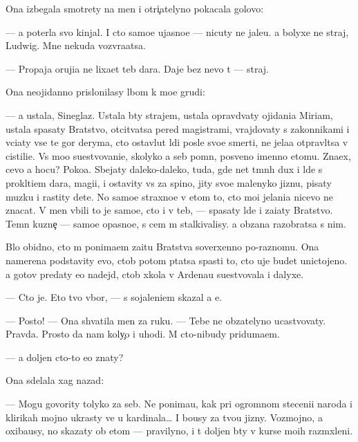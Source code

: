 \documentclass[10pt]{book}
\begin{document}
Ona izbegala smotrety na men{\ia} i otri{\c}atelyno pokacala golovo{\y}:

— {\Y}a poter{\ia}la svo{\y} kinjal. I cto samo{\y}e ujasno{\y}e — nicuty ne jale{\y}u. {\Y}a bolyxe ne straj, Ludwig. Mne nekuda vozvra{\x}atsa.

— Propaja oruji{\y}a ne lixa{\y}et teb{\ia} dara. Daje bez nevo t{\yi} — straj.

Ona neojidanno prislonilasy lbom k mo{\y}e{\y} grudi:

— {\Y}a ustala, Sineglaz{\yi}{\y}. Ustala b{\yi}ty strajem, ustala opravd{\yi}vaty ojidani{\y}a Miriam, ustala spasaty Bratstvo, otcit{\yi}vatsa pered magistrami, vrajdovaty s zakonnikami i v{\yi}ci{\x}aty vse te gor{\yi} deryma, cto ostavl{\ia}{\y}ut l{\iu}di posle svo{\y}e{\y} smerti, ne jela{\y}a otpravl{\ia}tsa v cistili{\x}e. Vs{\e} mo{\y}o su{\x}estvovani{\y}e, skolyko {\y}a seb{\ia} pomn{\iu}, posv{\ia}{\x}eno imenno etomu. Zna{\y}ex, cevo {\y}a hocu? Poko{\y}a. Sbejaty daleko-daleko, tuda, gde net t{\e}mn{\yi}h dux i l{\iu}de{\y} s prokl{\ia}ti{\y}em dara, magi{\y}i, i ostavity vs{\e} za spino{\y}, jity svo{\y}e{\y} malenyko{\y} jizn{\y}u, pisaty muz{\yi}ku i rastity dete{\y}. No samo{\y}e straxno{\y}e v etom to, cto mo{\y}i jelani{\y}a nicevo ne znacat. V men{\ia} vbili to je samo{\y}e, cto i v teb{\ia}, — spasaty l{\iu}de{\y} i za{\x}i{\x}aty Bratstvo. Temn{\yi}{\y} kuzne{\c} — samo{\y}e opasno{\y}e, s cem m{\yi} stalkivalisy. {\Y}a ob{\ia}zana razobratsa s nim.

B{\yi}lo obidno, cto m{\yi} ponima{\y}em za{\x}itu Bratstva soverxenno po-raznomu. Ona namerena podstavity {\y}evo, ctob{\yi} potom p{\yi}tatsa spasti to, cto uje budet unictojeno. {\Y}a gotov predaty {\y}e{\y}o nadejd{\yi}, ctob{\yi} xkola v Ardenau su{\x}estvovala i dalyxe.

— Cto je. Eto tvo{\y} v{\yi}bor, — s sojaleni{\y}em skazal {\y}a {\y}e{\y}.

— Posto{\y}! — Ona shvatila men{\ia} za ruku. — Tebe ne ob{\ia}zatelyno ucastvovaty. Pravda. Prosto da{\y} nam koly{\c}o i uhodi. M{\yi} cto-nibudy priduma{\y}em.

— {\Y}a doljen cto-to {\y}e{\x}o znaty?

Ona sdelala xag nazad:

— Mogu govority tolyko za seb{\ia}. Ne ponima{\y}u, kak pri ogromnom steceni{\y}i naroda i klirikah mojno ukrasty ve{\x} u kardinala… I bo{\y}usy za tvo{\y}u jizny. Vozmojno, {\y}a oxiba{\y}usy, no skazaty ob etom — pravilyno, i t{\yi} doljen b{\yi}ty v kurse mo{\y}ih razm{\yi}xleni{\y}.
\end{document}
